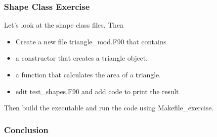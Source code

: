 \documentclass[11pt]{beamer}
\begin{document}

\begin{frame}[fragile]
\frametitle{Shape Class Exercise}

Let's look at the shape class files. Then
\begin{itemize}
\item Create a new file triangle\_mod.F90 that contains
\bi
\item a constructor that creates a triangle object.
\item a function that calculates the area of a triangle.
\ei
\item edit test\_shapes.F90 and add code to print the result
 \end{itemize}
Then build the executable and run the code using Makefile_exercise.

\end{frame}

\begin{frame}[fragile]
\frametitle{}



\end{frame}



\begin{frame}[fragile]
\frametitle{Conclusion}

\end{frame}
\end{document}
